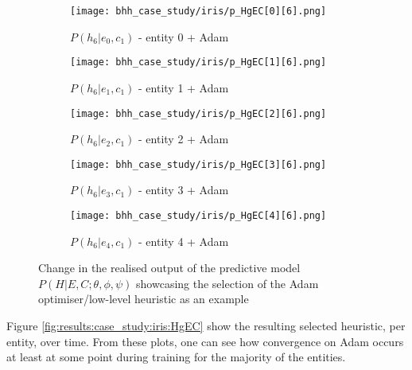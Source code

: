 \begin{figure}[htbp]
      \begin{subfigure}{0.5\textwidth}
            \centering
            \texttt{[image: bhh\_case\_study/iris/p\_HgEC[0][6].png]}
            \caption{$P\left(h_{6}|e_{0},c_{1}\right)$ - entity 0 + \Acs{Adam} }
            \label{fig:results:case_study:iris:p_HgEC:0:6}
      \end{subfigure}
      \begin{subfigure}{0.5\textwidth}
            \centering
            \texttt{[image: bhh\_case\_study/iris/p\_HgEC[1][6].png]}
            \caption{$P\left(h_{6}|e_{1},c_{1}\right)$ - entity 1 + \Acs{Adam} }
            \label{fig:results:case_study:iris:p_HgEC:1:6}
      \end{subfigure}
      \par\bigskip
      \begin{subfigure}{0.5\textwidth}
            \centering
            \texttt{[image: bhh\_case\_study/iris/p\_HgEC[2][6].png]}
            \caption{$P\left(h_{6}|e_{2},c_{1}\right)$ - entity 2 + \Acs{Adam} }
            \label{fig:results:case_study:iris:p_HgEC:2:6}
      \end{subfigure}
      \begin{subfigure}{0.5\textwidth}
            \centering
            \texttt{[image: bhh\_case\_study/iris/p\_HgEC[3][6].png]}
            \caption{$P\left(h_{6}|e_{3},c_{1}\right)$ - entity 3 + \Acs{Adam} }
            \label{fig:results:case_study:iris:p_HgEC:3:6}
      \end{subfigure}
      \par\bigskip
      \begin{subfigure}{\textwidth}
            \centering
            \texttt{[image: bhh\_case\_study/iris/p\_HgEC[4][6].png]}
            \caption{$P\left(h_{6}|e_{4},c_{1}\right)$ - entity 4 + \Acs{Adam} }
            \label{fig:results:case_study:iris:p_HgEC:4:6}
      \end{subfigure}
      \par\bigskip
      \caption{Change in the realised output of the predictive model $P\left(H|E,C;\theta,\phi,\psi \right)$ showcasing the selection of the \Acs{Adam} optimiser/low-level heuristic as an example}
      \label{fig:results:case_study:iris:p_HgEC}
\end{figure}

Figure \ref{fig:results:case_study:iris:HgEC} show the resulting selected heuristic, per entity, over time. From these plots, one can see how convergence on \Acs{Adam} occurs at least at some point during training for the majority of the entities.


